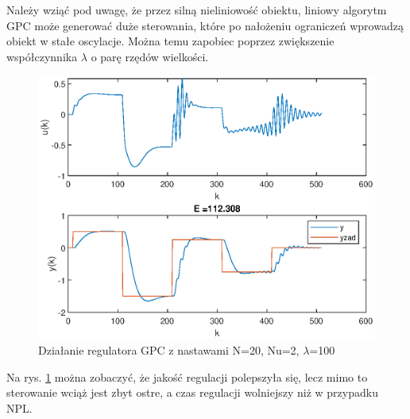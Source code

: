 		Należy wziąć pod uwagę, że przez silną nieliniowość obiektu, liniowy algorytm GPC może generować duże sterowania, które po nałożeniu ograniczeń wprowadzą obiekt w stałe oscylacje. Można temu zapobiec poprzez zwiększenie współczynnika $\lambda$ o parę rzędów wielkości.
		\begin{figure}[h!]
			\centering
			\includegraphics[width=\linewidth]{img/GPC100.eps}
			\caption{Działanie regulatora GPC z nastawami N=20, Nu=2, $\lambda$=100}
			\label{fig:GPC100}
		\end{figure}
		Na rys. \ref{fig:GPC100} można zobaczyć, że jakość regulacji polepszyła się, lecz mimo to sterowanie wciąż jest zbyt ostre, a czas regulacji wolniejszy niż w przypadku NPL.